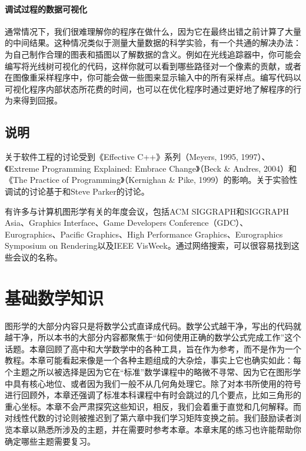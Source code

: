 \documentclass[lang=cn,12pt,marginpar=margintrue]{elegantbook}
\begin{document}
\subsubsection{调试过程的数据可视化}

通常情况下，我们很难理解你的程序在做什么，因为它在最终出错之前计算了大量的中间结果。这种情况类似于测量大量数据的科学实验，有一个共通的解决办法：为自己制作合理的图表和插图以了解数据的含义。例如在光线追踪器中，你可能会编写将光线树可视化的代码，这样你就可以看到哪些路径对一个像素的贡献，或者在图像重采样程序中，你可能会做一些图来显示输入中的所有采样点。编写代码以可视化程序内部状态所花费的时间，也可以在优化程序时通过更好地了解程序的行为来得到回报。


\section*{说明}
关于软件工程的讨论受到《Effective C++》系列（Meyers, 1995, 1997）、《Extreme Programming Explained: Embrace Change》（Beck \& Andres, 2004）和《The Practice of Programming》（Kernighan \& Pike, 1999）的影响。关于实验性调试的讨论基于和Steve Parker的讨论。

有许多与计算机图形学有关的年度会议，包括ACM SIGGRAPH和SIGGRAPH Asia、Graphics Interface、Game Developers Conference（GDC）、Eurographics、Pacific Graphics、High Performance Graphics、Eurographics Symposium on Rendering以及IEEE VisWeek。通过网络搜索，可以很容易找到这些会议的名称。

\chapter{基础数学知识}

图形学的大部分内容只是将数学公式直译成代码。数学公式越干净，写出的代码就越干净，所以本书的大部分内容都聚焦于“如何使用正确的数学公式完成工作”这个话题。本章回顾了高中和大学数学中的各种工具，旨在作为参考，而不是作为一个教程。本章可能看起来像是一个各种主题组成的大杂烩，事实上它也确实如此：每个主题之所以被选择是因为它在“标准”数学课程中的略微不寻常、因为它在图形学中具有核心地位、或者因为我们一般不从几何角处理它。除了对本书所使用的符号进行回顾外，本章还强调了标准本科课程中有时会跳过的几个要点，比如三角形的重心坐标。本章不会严肃探究这些知识，相反，我们会着重于直觉和几何解释。而对线性代数的讨论则被推迟到了第六章中我们学习矩阵变换之前。我们鼓励读者浏览本章以熟悉所涉及的主题，并在需要时参考本章。本章末尾的练习也许能帮助你确定哪些主题需要复习。
\end{document}
